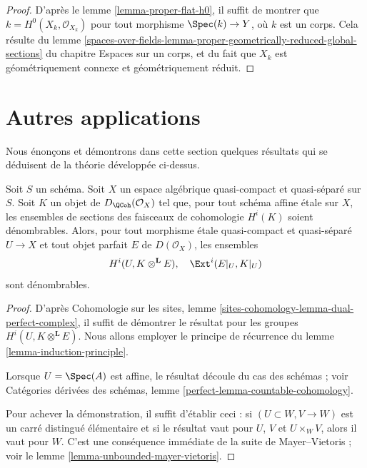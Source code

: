 \begin{proof}
D'apr\`es le lemme \ref{lemma-proper-flat-h0}, il suffit de montrer que
$k=H^0(X_k,\mathcal{O}_{X_k})$ pour tout morphisme $\Spec(k)\to Y$, o\`u $k$
est un corps. Cela r\'esulte du lemme
\ref{spaces-over-fields-lemma-proper-geometrically-reduced-global-sections}
du chapitre Espaces sur un corps, et du fait que $X_k$ est g\'eom\'etriquement connexe
et g\'eom\'etriquement r\'eduit.
\end{proof}






\section{Autres applications}
\label{section-other-applications}

\noindent
Nous \'enon\c{c}ons et d\'emontrons dans cette section quelques r\'esultats qui
se d\'eduisent de la th\'eorie d\'evelopp\'ee ci-dessus.

\begin{lemma}
\label{lemma-countable-cohomology}
Soit $S$ un sch\'ema. Soit $X$ un espace alg\'ebrique quasi-compact et
quasi-s\'epar\'e sur $S$. Soit $K$ un objet de
$D_\QCoh(\mathcal{O}_X)$ tel que, pour tout sch\'ema affine \'etale sur $X$,
les ensembles de sections des faisceaux de cohomologie $H^i(K)$ soient
d\'enombrables. Alors, pour tout morphisme \'etale quasi-compact et quasi-s\'epar\'e
$U\to X$ et tout objet parfait $E$ de $D(\mathcal{O}_X)$, les ensembles
$$
H^i(U, K \otimes^\mathbf{L} E),\quad \Ext^i(E|_U, K|_U)
$$
sont d\'enombrables.
\end{lemma}

\begin{proof}
D'apr\`es Cohomologie sur les sites, lemme
\ref{sites-cohomology-lemma-dual-perfect-complex}, il suffit de d\'emontrer le
r\'esultat pour les groupes $H^i(U,K\otimes^\mathbf{L}E)$.
Nous allons employer le principe de r\'ecurrence du lemme
\ref{lemma-induction-principle}.

\medskip\noindent
Lorsque $U=\Spec(A)$ est affine, le r\'esultat d\'ecoule du cas des sch\'emas ;
voir Cat\'egories d\'eriv\'ees des sch\'emas, lemme
\ref{perfect-lemma-countable-cohomology}.

\medskip\noindent
Pour achever la d\'emonstration, il suffit d'\'etablir ceci : si
$(U\subset W,V\to W)$ est un carr\'e distingu\'e \'el\'ementaire et si le
r\'esultat vaut pour $U$, $V$ et $U\times_WV$, alors il vaut pour $W$.
C'est une cons\'equence imm\'ediate de la suite de Mayer--Vietoris ; voir le
lemme \ref{lemma-unbounded-mayer-vietoris}.
\end{proof}

